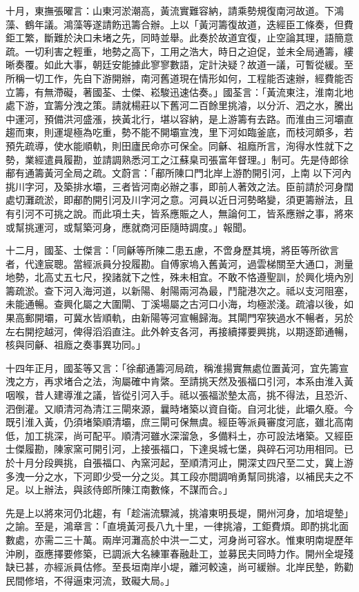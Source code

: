 \begin{pinyinscope}
十月，東撫張曜言：山東河淤潮高，黃流實難容納，請乘勢規復南河故道。下鴻藻、鶴年議。鴻藻等遂請飭迅籌合辦。上以「黃河籌復故道，迭經臣工條奏，但費鉅工繁，斷難於決口未堵之先，同時並舉。此奏於故道宜復，止空論其理，語簡意疏。一切利害之輕重，地勢之高下，工用之浩大，時日之迫促，並未全局通籌，縷晰奏覆。如此大事，朝廷安能據此寥寥數語，定計決疑？故道一議，可暫從緩。至所稱一切工作，先自下游開辦，南河舊道現在情形如何，工程能否速辦，經費能否立籌，有無滯礙，著國荃、士傑、崧駿迅速估奏。」國荃言：「黃流東注，淮南北地處下游，宜籌分洩之策。請就楊莊以下舊河二百餘里挑濬，以分沂、泗之水，騰出中運河，預備洪河盛漲，挾黃北行，堪以容納，是上游籌有去路。而淮由三河壩直趨而東，則運堤極為吃重，勢不能不開壩宣洩，里下河如臨釜底，而枝河頗多，若預先疏導，使水能順軌，則田廬民命亦可保全。同龢、祖廕所言，洵得水性就下之勢，業經遣員履勘，並請調熟悉河工之江蘇臬司張富年督理。」制可。先是侍郎徐郙有通籌黃河全局之疏。文蔚言：「郙所陳口門北岸上游酌開引河，上南以下河內挑川字河，及築排水壩，三者皆河南必辦之事，即前人著效之法。臣前請於河身闊處切灘疏淤，即郙酌開引河及川字河之意。河員以近日河勢略變，須更籌辦法，且有引河不可挑之說。而此項土夫，皆系應賑之人，無論何工，皆系應辦之事，將來或幫挑運河，或幫築河身，應就商河臣隨時調度。」報聞。

十二月，國荃、士傑言：「同龢等所陳二患五慮，不啻身歷其境，將臣等所欲言者，代達宸聰。當經派員分投履勘。自傅家塢入舊黃河，過雲梯關至大通口，測量地勢，北高丈五七尺，揆諸就下之性，殊未相宜。不敢不恪遵聖訓，於興化境內別籌疏淤。查下河入海河道，以新陽、射陽兩河為最，鬥龍港次之。祗以支河阻塞，未能通暢。查興化屬之大圍閘、丁溪場屬之古河口小海，均極淤淺。疏濬以後，如果高郵開壩，可冀水皆順軌，由新陽等河宣暢歸海。其閘門窄狹過水不暢者，另於左右開挖越河，俾得滔滔直注。此外幹支各河，再接續擇要興挑，以期逐節通暢，核與同龢、祖廕之奏事異功同。」

十四年正月，國荃等又言：「徐郙通籌河局疏，稱淮揚實無處位置黃河，宜先籌宣洩之方，再求堵合之法，洵屬確中肯綮。至請挑天然及張福口引河，本系由淮入黃咽喉，昔人建導淮之議，皆從引河入手。祗以張福淤墊太高，挑不得法，且恐沂、泗倒灌。又順清河為清江三閘來源，曩時堵築以資自衛。自河北徙，此壩久廢。今既引淮入黃，仍須堵築順清壩，庶三閘可保無虞。經臣等派員審度河底，雖北高南低，加工挑深，尚可配平。順清河雖水深溜急，多備料土，亦可設法堵築。又經臣士傑履勘，陳家窯可開引河，上接張福口，下達吳城七堡，與碎石河功用相同。已於十月分段興挑，自張福口、內窯河起，至順清河止，開深丈四尺至二丈，冀上游多洩一分之水，下河即少受一分之災。其工段亦間調哨勇幫同挑濬，以補民夫之不足。以上辦法，與該侍郎所陳江南數條，不謀而合。」

先是上以將來河仍北趨，有「趁湍流驟減，挑濬東明長堤，開州河身，加培堤墊」之諭。至是，鴻章言：「直境黃河長八九十里，一律挑濬，工鉅費煩。即酌挑北面數處，亦需二三十萬。兩岸河灘高於中洪一二丈，河身尚可容水。惟東明南堤歷年沖刷，亟應擇要修築，已調派大名練軍春融赴工，並募民夫同時力作。開州全堤殘缺已甚，亦經派員估修。至長垣南岸小堤，離河較遠，尚可緩辦。北岸民墊，飭勸民間修培，不得逼束河流，致礙大局。」


\end{pinyinscope}
